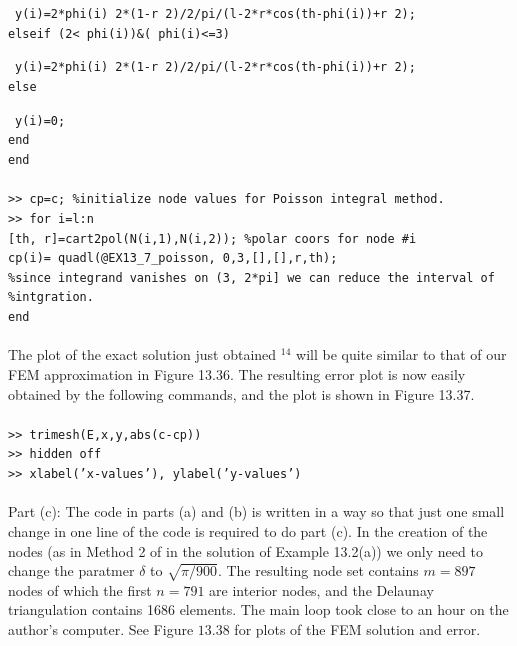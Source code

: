 \documentclass[../main.tex]{subfiles}
\begin{document}
~\texttt{y(i)=2*phi(i) 2*(1-r 2)/2/pi/(l-2*r*cos(th-phi(i))+r 2); 
}\\
\texttt{elseif (2< phi(i))\&( phi(i)<=3) }

~\texttt{y(i)=2*phi(i) 2*(1-r 2)/2/pi/(l-2*r*cos(th-phi(i))+r 2); 
}\\
\texttt{else}

~\texttt{y(i)=0;}\\
\texttt{end}\\
\texttt{end}
\\
\\
\texttt{>> cp=c; \%initialize node values for Poisson integral method. }\\
\texttt{>> for i=l:n}\\
\texttt{[th, r]=cart2pol(N(i,1),N(i,2)); \%polar coors for node \#i}\\
\texttt{cp(i)= quadl(@EX13\_7\_poisson, 0,3,[],[],r,th);}\\
\texttt{\%since integrand vanishes on (3, 2*pi] we can reduce the interval of}\\
\texttt{\%intgration.}\\
\texttt{end}
\\
\\
The plot of the exact solution just obtained ${ }^{14}$
 will be quite similar to that of our FEM approximation in Figure 13.36. The resulting error plot is now easily obtained by the following commands, and the plot is shown in Figure 13.37.
\\
\\
\texttt{>> trimesh(E,x,y,abs(c-cp))}\\
\texttt{>> hidden off }\\
\texttt{>> xlabel('x-values'), ylabel('y-values') }
\\
\\
Part (c): The code in parts (a) and (b) is written in a way so that just one small change in one line of the code is required to do part (c). In the creation of the nodes (as in Method 2 of in the solution of Example 13.2(a)) we only need to change the paratmer $\delta$ to $\sqrt{\pi / 900}$. The resulting node set contains $m=897$ nodes of which the first $n=791$ are interior nodes, and the Delaunay triangulation contains 1686 elements. The main loop took close to an hour on the author's computer. See Figure $13.38$ for plots of the FEM solution and error.
\end{document}
